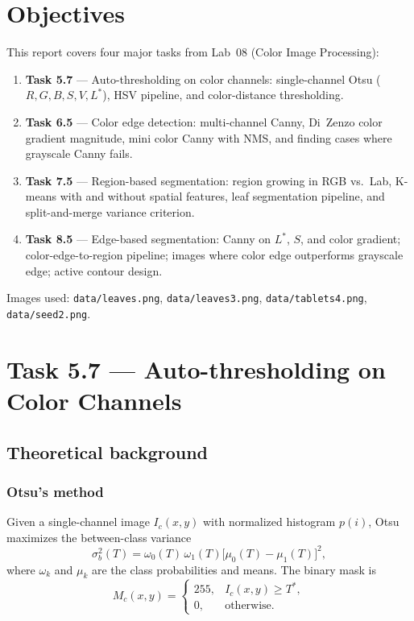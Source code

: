 \documentclass[12pt,a4paper]{article}
\begin{document}
\section{Objectives}
This report covers four major tasks from Lab~08 (Color Image Processing):
\begin{enumerate}
    \item \textbf{Task 5.7} --- Auto-thresholding on color channels: single-channel Otsu ($R,G,B,S,V,L^*$), HSV pipeline, and color-distance thresholding.
    \item \textbf{Task 6.5} --- Color edge detection: multi-channel Canny, Di~Zenzo color gradient magnitude, mini color Canny with NMS, and finding cases where grayscale Canny fails.
    \item \textbf{Task 7.5} --- Region-based segmentation: region growing in RGB vs.\ Lab, K-means with and without spatial features, leaf segmentation pipeline, and split-and-merge variance criterion.
    \item \textbf{Task 8.5} --- Edge-based segmentation: Canny on $L^*$, $S$, and color gradient; color-edge-to-region pipeline; images where color edge outperforms grayscale edge; active contour design.
\end{enumerate}
Images used: \texttt{data/leaves.png}, \texttt{data/leaves3.png}, \texttt{data/tablets4.png}, \texttt{data/seed2.png}.

\section{Task 5.7 — Auto-thresholding on Color Channels}

\subsection{Theoretical background}

\subsubsection{Otsu's method}
Given a single-channel image $I_c(x,y)$ with normalized histogram $p(i)$, Otsu maximizes the between-class variance
\[
\sigma_b^2(T)=\omega_0(T)\,\omega_1(T)\bigl[\mu_0(T)-\mu_1(T)\bigr]^2,
\]
where $\omega_k$ and $\mu_k$ are the class probabilities and means.  The binary mask is
\[
M_c(x,y)=
\begin{cases}
255, & I_c(x,y)\ge T^*, \\
0,   & \text{otherwise.}
\end{cases}
\]
\end{document}
